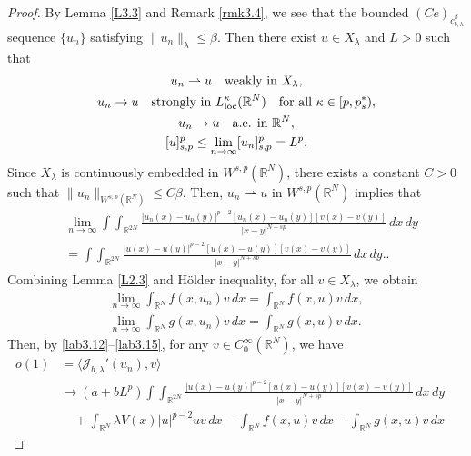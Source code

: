\documentclass[reqno]{amsart}
\begin{document}
\begin{proof}
By Lemma \ref{L3.3} and Remark \ref{rmk3.4}, we see that the bounded 
$(Ce)_{c_{b,\lambda}^\beta}$ sequence $\{u_n\}$ satisfying $\|u_n\|_\lambda\leq \beta$. 
Then there exist $u\in X_\lambda$ and $L>0$ such that
\begin{equation}\label{lab3.12}
\begin{gathered}
u_n\rightharpoonup u \quad \text{weakly in } X_\lambda, \\
u_n\to  u  \quad \text{strongly in } L^\kappa_{\rm loc}(\mathbb{R}^N) \quad
\text{for all } \kappa\in[p,p_s^*), \\
u_n\to  u  \quad \text{a.e. in } \mathbb{R}^N, \\
[u]^p_{s,p}\leq \lim_{n\to \infty}[u_n]^p_{s,p}=L^p.
\end{gathered}
\end{equation}
Since $X_\lambda$ is continuously embedded in $W^{s,p}(\mathbb{R}^N)$, 
there exists a constant $C>0$ such that $\|u_n\|_{W^{s,p}(\mathbb{R}^N)}\leq C\beta$. 
Then, $u_n\rightharpoonup u$ in $W^{s,p}(\mathbb{R}^N)$ implies that
\begin{equation}\label{lab3.13}
\begin{split}
&\lim_{n\to \infty}\int\int_{\mathbb{R}^{2N}}
 \frac{|u_n(x)-u_n(y)|^{p-2}[u_n(x)-u_n(y)][v(x)-v(y)]}{|x-y|^{N+sp}}\,dx\,dy\\
&=\int\int_{\mathbb{R}^{2N}}
 \frac{|u(x)-u(y)|^{p-2}[u(x)-u(y)][v(x)-v(y)]}{|x-y|^{N+sp}}\,dx\,dy..
\end{split}
\end{equation}
Combining Lemma \ref{L2.3} and H\"older inequality, for all $v\in X_\lambda$, 
we obtain
\begin{gather}\label{lab3.14}
\lim_{n\to \infty}\int_{\mathbb{R}^N}f(x, u_n)v\,dx=\int_{\mathbb{R}^N}f(x, u)v\,dx,\\
\label{lab3.15}
\lim_{n\to \infty}\int_{\mathbb{R}^N}g(x, u_n)v\,dx=\int_{\mathbb{R}^N}g(x, u)v\,dx.
\end{gather}
Then, by \eqref{lab3.12}--\eqref{lab3.15}, for any $v\in C^\infty_0(\mathbb{R}^N)$, 
we have
\begin{align*}
o(1)&= \langle \mathcal{J}_{b,\lambda}'(u_n), v \rangle  \\
&\to  (a+bL^p)\int\int_{\mathbb{R}^{2N}}\frac{|u(x)-u(y)|^{p-2}[u(x)-u(y)]
 [v(x)-v(y)]}{|x-y|^{N+sp}}\,dx\,dy  \\
&\quad +\int_{\mathbb{R}^N}\lambda V(x)|u|^{p-2}uv\,dx 
 -\int_{\mathbb{R}^N}f(x,u)v\,dx-\int_{\mathbb{R}^N}g(x,u)v\,dx \quad

\end{align*}
\end{proof}
\end{document}
